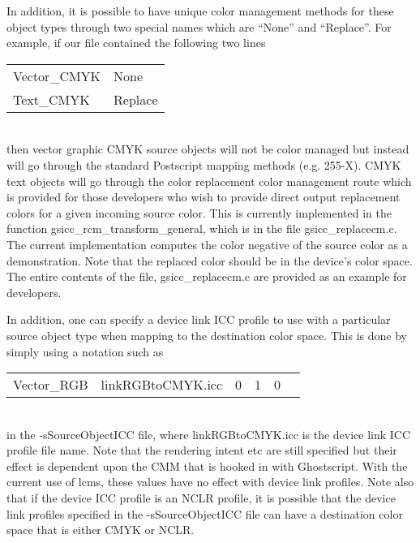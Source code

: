 \documentclass[12pt,notitlepage]{article}
\begin{document}
In addition, it is possible to have unique color management methods for these object types through two special names which are ``None'' and ``Replace''.   For example, if our file contained the following two lines\\

\begin{tabular}{ll}
Vector\_CMYK & None \\
Text\_CMYK	& Replace  \\
\end{tabular}\\

\noindent then vector graphic CMYK source objects will not be color managed but instead will go through the standard Postscript mapping methods (e.g. 255-X).   CMYK text objects will go through the color replacement color management route which is provided for those developers who wish to provide direct output replacement colors for a given incoming source color.  This is currently implemented in the function gsicc\_rcm\_transform\_general, which is in the file gsicc\_replacecm.c.  The current implementation computes the color negative of the source color as a demonstration.  Note that the replaced color should be in the device's color space.   The entire contents of the file, gsicc\_replacecm.c are provided as an example for developers.

In addition, one can specify a device link ICC profile to use with a particular source object type when mapping to the destination color space.  This is done by simply using a notation such as\\

\begin{tabular}{llllll}
Vector\_RGB &	linkRGBtoCMYK.icc	& 0 & 1 & 0 & \\
\end{tabular}\\

\noindent in the -sSourceObjectICC file, where linkRGBtoCMYK.icc is the device link ICC profile file name.  Note that the rendering intent etc are still specified but their effect is dependent upon the CMM that is hooked in with Ghostscript.  With the current use of lcms, these values have no effect with device link profiles.   Note also that if the device ICC profile is an NCLR profile, it is possible that the device link profiles specified in the -sSourceObjectICC file can have a destination color space that is either CMYK or NCLR.
\end{document}
